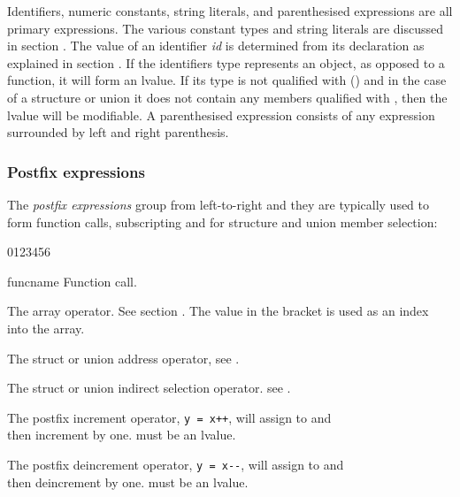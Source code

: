 Identifiers, numeric constants, string literals, and parenthesised
expressions are all primary expressions.  The various constant types
and string literals are discussed in section .  The
value of an identifier {\it id} is determined from its declaration as
explained in section . If the identifiers type
represents an object, as opposed to a function, it will form an
lvalue. If its type is not qualified with 
() and in the case of a structure or union
it does not contain any members qualified with , then the
lvalue will be modifiable. A parenthesised expression consists of any
expression surrounded by left and right parenthesis.

\subsubsection{Postfix expressions}
\label{sec:PostfixExpression}
The {\it postfix expressions} group from left-to-right and they are
typically used to form function calls, subscripting and for
structure and union member selection:

\begin{production}
\end{production}

\begin{production}
\begin{Ventry3}{0123456}
\item[\T{()}]     funcname\T{()} Function call.
\item[\T{[]}]     The array operator. See section . 
                  The value in the bracket is used as an index into the array.
\item[\T{.}]      The struct or union address operator, see .
\item[\T{-$>$}]   The struct or union indirect selection operator. see .
\item[\T{++}]     
The postfix increment operator, \verb!y = x++!, will assign
 to  and \\ then increment  by one.  must  be an
lvalue.
                 

\item[\T{--}]     

The postfix deincrement operator, \verb+y = x--+,  will assign 
 to  and \\ then deincrement  by one.  must be an
lvalue.

\end{Ventry3}
\end{production}


